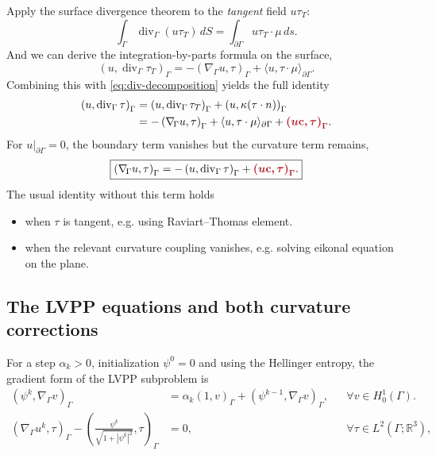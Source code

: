 \documentclass[11pt,a4paper]{article}
\newcommand{\curv}[1]{{\color{curvred}\bm{#1}}}
\newcommand{\G}{\Gamma}
\newcommand{\gradG}{\nabla_{\!\G}}
\newcommand{\divG}{\operatorname{div}_{\G}}
\newcommand{\cv}{\mathbf c}
\newcommand{\ip}[2]{\left(#1,#2\right)_{\G}}
\newcommand{\R}{\mathbb R}
\begin{document}
Apply the surface divergence theorem to the \emph{tangent} field $u\tau_T$:
\begin{equation}
 \int_\G\divG(u\tau_T)\,dS
   =\int_{\partial\G}u\tau_T\cdot\mu\,ds.
\end{equation}
And we can derive the integration-by-parts formula on the surface,
\begin{equation}
 \ip{u}{\divG\tau_T}
   =-\ip{\gradG u}{\tau}
     +\langle u,\tau\cdot\mu\rangle_{\partial\G}.
\end{equation}
Combining this with \eqref{eq:div-decomposition} yields the full identity
\begin{align}
 \ip{u}{\divG\tau}
   & = \ip{u}{\divG \tau_T} + \ip{u}{\kappa (\tau \cdot n)} \nonumber \\
   &=-\ip{\gradG u}{\tau}
    +\langle u,\tau\cdot\mu\rangle_{\partial\G}+\curv{\ip{u\cv}{\tau}}.
 \label{eq:ibp}
\end{align}
For $u|_{\partial\G}=0$, the boundary term vanishes but the curvature term remains,
\begin{equation}
 \boxed{\ip{\gradG u}{\tau}
       =-\ip{u}{\divG\tau}+\curv{\ip{u\cv}{\tau}}.}
 \label{eq:ibp-zero}
\end{equation}
The usual identity without this term holds
\begin{itemize}
    \item when $\tau$ is tangent, e.g. using Raviart--Thomas element.
    \item when the relevant curvature coupling vanishes, e.g. solving eikonal equation on the plane.
\end{itemize}

\subsection{The LVPP equations and both curvature corrections}

For a step  $\alpha_k>0$, initialization $\psi^0=0$ and using the Hellinger entropy,
the gradient form of the LVPP subproblem is \cite{lvpp}
\begin{subequations}\label{eq:primal-system}
\begin{align}
 \ip{\psi^k}{\gradG v} 
 &= \alpha_k\ip{1}{v} + \ip{\psi^{k-1}}{\gradG v},
 && \forall v\in H_0^1(\G).\label{eq:primal-a} \\
 \ip{\gradG u^k}{\tau} - \ip{\frac{\psi^k}{\sqrt{1+|\psi^k|^2}}}{\tau}
 &=0,
 &&\forall \tau\in L^2(\G;\R^3),\label{eq:primal-b}
\end{align}
\end{subequations}
\end{document}

